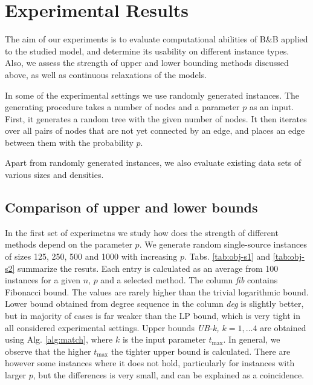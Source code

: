 \section{Experimental Results} \label{sec:exp}

The aim of our experiments is to evaluate computational abilities of B\&B applied to the studied model, and determine its usability on different instance types.
Also, we assess the strength of upper and lower bounding methods discussed above, as well as continuous relaxations of the models.

In some of the experimental settings we use randomly generated instances.
The generating procedure takes a number of nodes and a parameter $p$ as an input.
First, it generates a random tree with the given number of nodes.
It then iterates over all pairs of nodes that are not yet connected by an edge, and places an edge between them with the probability $p$.

Apart from randomly generated instances, we also evaluate existing data sets of various sizes and densities.

\subsection{Comparison of upper and lower bounds}

In the first set of experimetns we study how does the strength of different methods depend on the parameter $p$.
We generate random single-source instances of sizes 125, 250, 500 and 1000 with increasing $p$.
Tabs. \ref{tab:obj-s1} and \ref{tab:obj-s2} summarize the resuts.
Each entry is calculated as an average from 100 instances for a given $n$, $p$ and a selected method.
The column \emph{fib} contains Fibonacci bound.
The values are rarely higher than the trivial logarithmic bound.
Lower bound obtained from degree sequence in the column \emph{deg} is slightly better, 
but in majority of cases is far weaker than the LP bound, which is very tight in all considered experimental settings.
Upper bounds \emph{UB-k, $k=1,\dots 4$} are obtained using Alg. \ref{alg:match}, where $k$ is the input parameter $t_{\text{max}}$.
In general, we observe that the higher $t_{\text{max}}$ the tighter upper bound is calculated.
There are however some instances where it does not hold, particularly for instances with larger $p$,  but the differences is very small, and can be explained as a coincidence.


